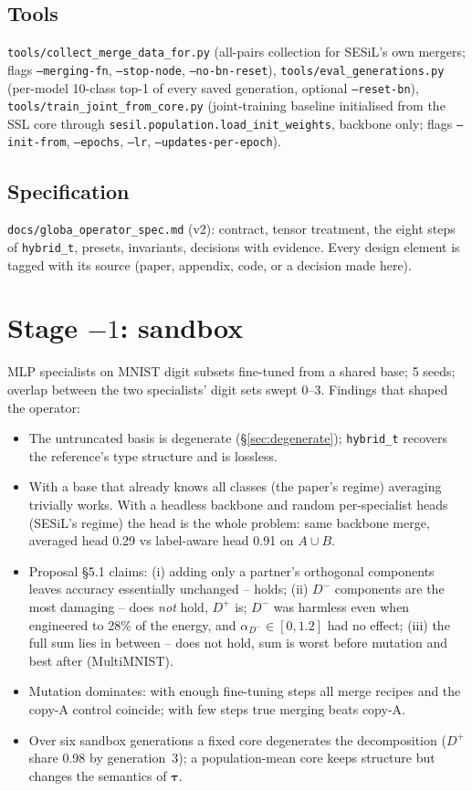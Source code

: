 \documentclass[11pt,a4paper]{article}
\newcommand{\tauv}{\boldsymbol{\tau}}
\newcommand{\Dp}{D^{+}}
\newcommand{\Dm}{D^{-}}
\newcommand{\code}[1]{\texttt{#1}}
\begin{document}
\subsection{Tools}
\code{tools/collect\_merge\_data\_for.py} (all-pairs collection for SESiL's own mergers; flags \code{--merging-fn}, \code{--stop-node}, \code{--no-bn-reset}), \code{tools/eval\_generations.py} (per-model 10-class top-1 of every saved generation, optional \code{--reset-bn}), \code{tools/train\_joint\_from\_core.py} (joint-training baseline initialised from the SSL core through \code{sesil.population.load\_init\_weights}, backbone only; flags \code{--init-from}, \code{--epochs}, \code{--lr}, \code{--updates-per-epoch}).

\subsection{Specification}
\code{docs/globa\_operator\_spec.md} (v2): contract, tensor treatment, the eight steps of \code{hybrid\_t}, presets, invariants, decisions with evidence. Every design element is tagged with its source (paper, appendix, code, or a decision made here).

\section{Stage $-1$: sandbox}
\label{sec:sandbox}
MLP specialists on MNIST digit subsets fine-tuned from a shared base; 5 seeds; overlap between the two specialists' digit sets swept 0--3. Findings that shaped the operator:
\begin{itemize}[nosep]
\item The untruncated basis is degenerate (\S\ref{sec:degenerate}); \code{hybrid\_t} recovers the reference's type structure and is lossless.
\item With a base that already knows all classes (the paper's regime) averaging trivially works. With a headless backbone and random per-specialist heads (SESiL's regime) the head is the whole problem: same backbone merge, averaged head 0.29 vs label-aware head 0.91 on $A\cup B$.
\item Proposal \S5.1 claims: (i) adding only a partner's orthogonal components leaves accuracy essentially unchanged -- holds; (ii) $\Dm$ components are the most damaging -- does \emph{not} hold, $\Dp$ is; $\Dm$ was harmless even when engineered to 28\% of the energy, and $\alpha_{\Dm}\in[0,1.2]$ had no effect; (iii) the full sum lies in between -- does not hold, sum is worst before mutation and best after (MultiMNIST).
\item Mutation dominates: with enough fine-tuning steps all merge recipes and the copy-A control coincide; with few steps true merging beats copy-A.
\item Over six sandbox generations a fixed core degenerates the decomposition ($\Dp$ share 0.98 by generation~3); a population-mean core keeps structure but changes the semantics of $\tauv$.
\end{itemize}
\end{document}
